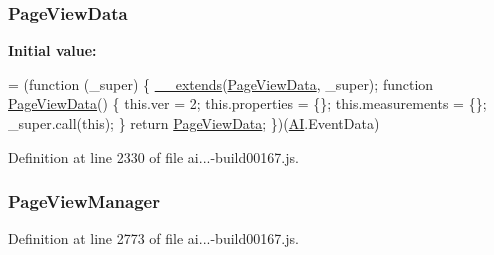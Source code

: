 \subsubsection[{\texorpdfstring{Page\+View\+Data}{PageViewData}}]{ Page\+View\+Data}\hypertarget{_scripts_2ai_80_822_89-build00167_8js_ac6cfe0b215811b1151dc8243d8c9d792}{}\label{_scripts_2ai_80_822_89-build00167_8js_ac6cfe0b215811b1151dc8243d8c9d792}
{\bfseries Initial value\+:}
\begin{DoxyCode}
= (\textcolor{keyword}{function} (\_super) \{
        \hyperlink{obj_2_release_2_package_2_package_tmp_2_scripts_2ai_80_822_89-build00167_8js_ac09f4951ac4b25df0272d4e78ff85ae0}{\_\_extends}(\hyperlink{obj_2_release_2_package_2_package_tmp_2_scripts_2ai_80_822_89-build00167_8js_ac6cfe0b215811b1151dc8243d8c9d792}{PageViewData}, \_super);
        \textcolor{keyword}{function} \hyperlink{obj_2_release_2_package_2_package_tmp_2_scripts_2ai_80_822_89-build00167_8js_ac6cfe0b215811b1151dc8243d8c9d792}{PageViewData}() \{
            this.ver = 2;
            this.properties = \{\};
            this.measurements = \{\};
            \_super.call(\textcolor{keyword}{this});
        \}
        \textcolor{keywordflow}{return} \hyperlink{obj_2_release_2_package_2_package_tmp_2_scripts_2ai_80_822_89-build00167_8js_ac6cfe0b215811b1151dc8243d8c9d792}{PageViewData};
    \})(\hyperlink{obj_2_release_2_package_2_package_tmp_2_scripts_2ai_80_822_89-build00167_8js_aa840f97564574b54956c385088b90e81}{AI}.EventData)
\end{DoxyCode}


Definition at line 2330 of file ai...-\/build00167.\+js.

\subsubsection[{\texorpdfstring{Page\+View\+Manager}{PageViewManager}}]{ Page\+View\+Manager}\hypertarget{_scripts_2ai_80_822_89-build00167_8js_a1953356b8d75c486cf82acbd85c5cc9e}{}\label{_scripts_2ai_80_822_89-build00167_8js_a1953356b8d75c486cf82acbd85c5cc9e}


Definition at line 2773 of file ai...-\/build00167.\+js.

